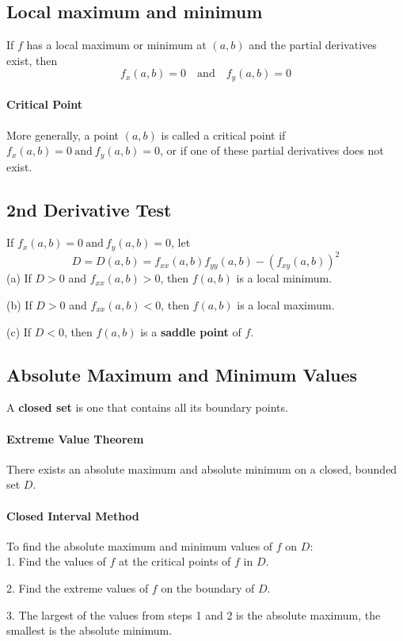 \documentclass{report}  %
\begin{document}
\subsection*{Local maximum and minimum}
If $f$ has a local maximum or minimum at $(a, b)$ and the partial derivatives exist, then 
\begin{equation}
	f_x (a, b) = 0 \quad \text{and} \quad f_y (a, b) = 0
\end{equation} 

\paragraph{Critical Point} 
More generally, a point $(a, b)$ is called a critical point if $f_x (a, b) = 0 \  \text{and} \  f_y (a, b) = 0$, 
or if one of these partial derivatives does not exist. 

\subsection*{2nd Derivative Test}
If $f_x (a, b) = 0 \  \text{and} \  f_y (a, b) = 0$, let 
\begin{equation}
	D = D(a, b) = f_{xx}(a, b) f_{yy}(a, b) - (f_{xy}(a,b))^2
\end{equation}
(a) If $D > 0$ and $f_{xx}(a, b) > 0$, then $f(a, b)$ is a local minimum.

(b) If $D > 0$ and $f_{xx}(a, b) < 0$, then $f(a, b)$ is a local maximum.

(c) If $D < 0$, then $f(a, b)$ is a \textbf{saddle point} of $f$. 

\subsection*{Absolute Maximum and Minimum Values}
A \textbf{closed set} is one that contains all its boundary points. 

\paragraph{Extreme Value Theorem} 
There exists an absolute maximum and absolute minimum on a closed, bounded set $D$. 

\paragraph{Closed Interval Method}
To find the absolute maximum and minimum values of $f$ on $D$: \\

1. Find the values of $f$ at the critical points of $f$ in $D$. 

2. Find the extreme values of $f$ on the boundary of $D$.

3. The largest of the values from steps 1 and 2 is the absolute maximum, the smallest is the absolute minimum. 
\end{document}
